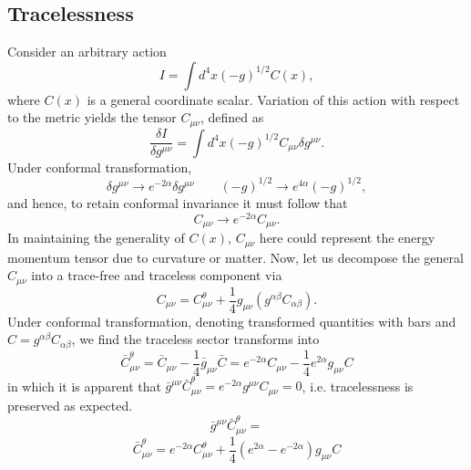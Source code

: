 \documentclass[10pt,letterpaper]{article}
\numberwithin{equation}{subsection}
\begin{document}
\subsection{Tracelessness}
Consider an arbitrary action
\begin{equation}
	I = \int d^4x (-g)^{1/2} C(x),
\end{equation}
where $C(x)$ is a general coordinate scalar. Variation of this action with respect to the metric yields the tensor $C_{\mu\nu}$, defined as
\begin{equation} 
\frac{\delta I}{\delta g^{\mu\nu}} = \int d^4x (-g)^{1/2} C_{\mu\nu} \delta g^{\mu\nu}.
\end{equation} 
Under conformal transformation, 
\begin{equation}
\delta g^{\mu\nu} \to e^{-2\alpha}\delta g^{\mu\nu}\qquad (-g)^{1/2} \to e^{4\alpha}(-g)^{1/2},
\end{equation}
and hence, to retain conformal invariance it must follow that
\begin{equation}
C_{\mu\nu} \to e^{-2\alpha}C_{\mu\nu}.
\end{equation}
In maintaining the generality of $C(x)$, $C_{\mu\nu}$ here could represent the energy momentum tensor due to curvature or matter. Now, let us decompose the general $C_{\mu\nu}$ into a trace-free and traceless component via
\begin{equation}
C_{\mu\nu} = C^{\theta}_{\mu\nu} + \frac14 g_{\mu\nu}\left( g^{\alpha\beta} C_{\alpha\beta}\right).
\end{equation}
Under conformal transformation, denoting transformed quantities with bars and $C = g^{\alpha\beta}C_{\alpha\beta}$, we find the traceless sector transforms into
\begin{equation}
\bar C_{\mu\nu}^\theta = \bar C_{\mu\nu}- \frac14 \bar g_{\mu\nu} \bar C = e^{-2\alpha}C_{\mu\nu} - \frac14 e^{2\alpha} g_{\mu\nu} C
\end{equation}
in which it is apparent that $\bar g^{\mu\nu} \bar C^\theta_{\mu\nu} = e^{-2\alpha}g^{\mu\nu}C_{\mu\nu}= 0$, i.e. tracelessness is preserved as expected.
\begin{equation}
	\bar g^{\mu\nu} \bar C_{\mu\nu}^\theta = 
\end{equation}
\begin{equation}
	\bar C_{\mu\nu}^\theta = e^{-2\alpha} C_{\mu\nu}^\theta + \frac14 (e^{2\alpha} - e^{-2\alpha})g_{\mu\nu} C
\end{equation}
\end{document}
